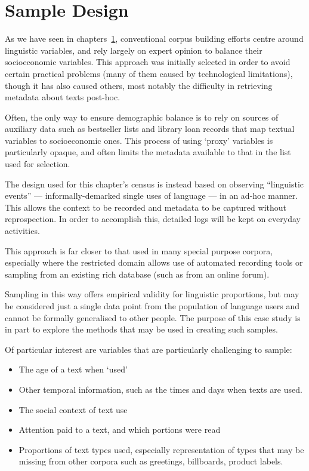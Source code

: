 \section{Sample Design}
As we have seen in chapters~\ref{}, conventional corpus building efforts centre around linguistic variables, and rely largely on expert opinion to balance their socioeconomic variables.  This approach was initially selected in order to avoid certain practical problems (many of them caused by technological limitations), though it has also caused others, most notably the difficulty in retrieving metadata about texts post-hoc.

Often, the only way to ensure demographic balance is to rely on sources of auxiliary data such as bestseller lists and library loan records that map textual variables to socioeconomic ones.  This process of using `proxy' variables is particularly opaque, and often limits the metadata available to that in the list used for selection.

The design used for this chapter's census is instead based on observing ``linguistic events'' --- informally-demarked single uses of language --- in an ad-hoc manner.  This allows the context to be recorded and metadata to be captured without reprospection.  In order to accomplish this, detailed logs will be kept on everyday activities.

This approach is far closer to that used in many special purpose corpora, especially where the restricted domain allows use of automated recording tools or sampling from an existing rich database (such as from an online forum).

Sampling in this way offers empirical validity for linguistic proportions, but may be considered just a single data point from the population of language users and cannot be formally generalised to other people.  The purpose of this case study is in part to explore the methods that may be used in creating such samples.

Of particular interest are variables that are particularly challenging to sample:

\begin{itemize}
    \item The age of a text when `used'
    \item Other temporal information, such as the times and days when texts are used.
    \item The social context of text use
    \item Attention paid to a text, and which portions were read
    \item Proportions of text types used, especially representation of types that may be missing from other corpora such as greetings, billboards, product labels.
\end{itemize}

